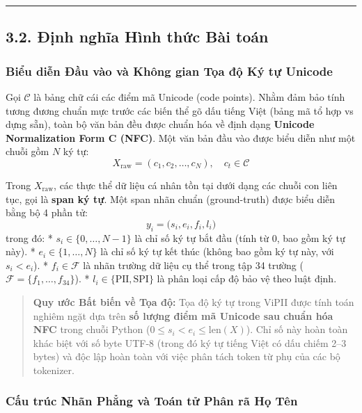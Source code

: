\documentclass[
  11pt,
  a4paper,
]{article}
\begin{document}
\begin{center}\rule{0.5\linewidth}{0.5pt}\end{center}

\subsection{3.2. Định nghĩa Hình thức Bài
toán}\label{ux111ux1ecbnh-nghux129a-huxecnh-thux1ee9c-buxe0i-touxe1n}

\subsubsection{Biểu diễn Đầu vào và Không gian Tọa độ Ký tự
Unicode}\label{biux1ec3u-diux1ec5n-ux111ux1ea7u-vuxe0o-vuxe0-khuxf4ng-gian-tux1ecda-ux111ux1ed9-kuxfd-tux1ef1-unicode}

Gọi \(\mathcal{C}\) là bảng chữ cái các điểm mã Unicode (code points). Nhằm đảm bảo tính tương đương
chuẩn mực trước các biến thể gõ dấu tiếng Việt (bảng mã tổ hợp vs dựng sẵn), toàn bộ văn bản đều
được chuẩn hóa về định dạng \textbf{Unicode Normalization Form C (NFC)}. Một văn bản đầu vào được
biểu diễn như một chuỗi gồm \(N\) ký tự:
\[X_{\text{raw}} = (c_1, c_2, \dots, c_N), \quad c_t \in \mathcal{C}\]

Trong \(X_{\text{raw}}\), các thực thể dữ liệu cá nhân tồn tại dưới dạng các chuỗi con liên tục, gọi
là \textbf{span ký tự}. Một span nhãn chuẩn (ground-truth) được biểu diễn bằng bộ 4 phần tử:
\[y_i = \bigl(s_i, e_i, f_i, l_i\bigr)\] trong đó: * \(s_i \in \{0, \dots, N-1\}\) là chỉ số ký tự
bắt đầu (tính từ 0, bao gồm ký tự này). * \(e_i \in \{1, \dots, N\}\) là chỉ số ký tự kết thúc
(không bao gồm ký tự này, với \(s_i < e_i\)). * \(f_i \in \mathcal{F}\) là nhãn trường dữ liệu cụ
thể trong tập 34 trường (\(\mathcal{F} = \{f_1, \dots, f_{34}\}\)). *
\(l_i \in \{\text{PII}, \text{SPI}\}\) là phân loại cấp độ bảo vệ theo luật định.

\begin{quote}
\textbf{Quy ước Bất biến về Tọa độ:} Tọa độ ký tự trong ViPII được tính toán nghiêm ngặt dựa trên
\textbf{số lượng điểm mã Unicode sau chuẩn hóa NFC} trong chuỗi Python
(\(0 \le s_i < e_i \le \text{len}(X)\)). Chỉ số này hoàn toàn khác biệt với số byte UTF-8 (trong đó
ký tự tiếng Việt có dấu chiếm 2--3 bytes) và độc lập hoàn toàn với việc phân tách token từ phụ của
các bộ tokenizer.
\end{quote}

\subsubsection{Cấu trúc Nhãn Phẳng và Toán tử Phân rã Họ
Tên}\label{cux1ea5u-truxfac-nhuxe3n-phux1eb3ng-vuxe0-touxe1n-tux1eed-phuxe2n-ruxe3-hux1ecd-tuxean}
\end{document}
